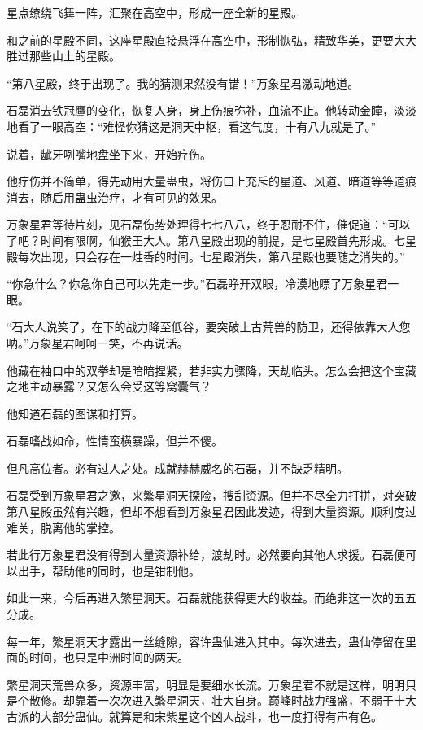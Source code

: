 
\begin{this_body}



星点缭绕飞舞一阵，汇聚在高空中，形成一座全新的星殿。

和之前的星殿不同，这座星殿直接悬浮在高空中，形制恢弘，精致华美，更要大大胜过那些山上的星殿。

“第八星殿，终于出现了。我的猜测果然没有错！”万象星君激动地道。

石磊消去铁冠鹰的变化，恢复人身，身上伤痕弥补，血流不止。他转动金瞳，淡淡地看了一眼高空：“难怪你猜这是洞天中枢，看这气度，十有八九就是了。”

说着，龇牙咧嘴地盘坐下来，开始疗伤。

他疗伤并不简单，得先动用大量蛊虫，将伤口上充斥的星道、风道、暗道等等道痕消去，随后用蛊虫治疗，才有可见的效果。

万象星君等待片刻，见石磊伤势处理得七七八八，终于忍耐不住，催促道：“可以了吧？时间有限啊，仙猴王大人。第八星殿出现的前提，是七星殿首先形成。七星殿每次出现，只会存在一炷香的时间。七星殿消失，第八星殿也要随之消失的。”

“你急什么？你急你自己可以先走一步。”石磊睁开双眼，冷漠地瞟了万象星君一眼。

“石大人说笑了，在下的战力降至低谷，要突破上古荒兽的防卫，还得依靠大人您呐。”万象星君呵呵一笑，不再说话。

他藏在袖口中的双拳却是暗暗捏紧，若非实力骤降，天劫临头。怎么会把这个宝藏之地主动暴露？又怎么会受这等窝囊气？

他知道石磊的图谋和打算。

石磊嗜战如命，性情蛮横暴躁，但并不傻。

但凡高位者。必有过人之处。成就赫赫威名的石磊，并不缺乏精明。

石磊受到万象星君之邀，来繁星洞天探险，搜刮资源。但并不尽全力打拼，对突破第八星殿虽然有兴趣，但却不想看到万象星君因此发迹，得到大量资源。顺利度过难关，脱离他的掌控。

若此行万象星君没有得到大量资源补给，渡劫时。必然要向其他人求援。石磊便可以出手，帮助他的同时，也是钳制他。

如此一来，今后再进入繁星洞天。石磊就能获得更大的收益。而绝非这一次的五五分成。

每一年，繁星洞天才露出一丝缝隙，容许蛊仙进入其中。每次进去，蛊仙停留在里面的时间，也只是中洲时间的两天。

繁星洞天荒兽众多，资源丰富，明显是要细水长流。万象星君不就是这样，明明只是个散修。却靠着一次次进入繁星洞天，壮大自身。巅峰时战力强盛，不弱于十大古派的大部分蛊仙。就算是和宋紫星这个凶人战斗，也一度打得有声有色。


\end{this_body}
